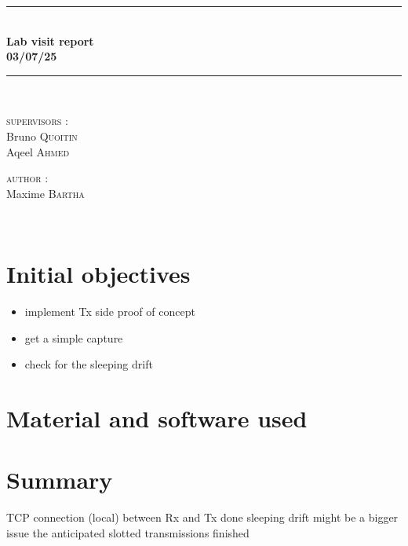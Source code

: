 \documentclass[a4paper, 12pt]{article}
\newcommand{\HRule}{\rule{\linewidth}{0.3mm}}
\begin{document}
\begin{center}
\HRule \\[0.3cm]
{ \LARGE \bfseries Lab visit report \\[0.3cm]}
{ \LARGE \bfseries 03/07/25 \\[0.1cm]} %
\HRule \\[1.5cm]

\begin{minipage}[t]{0.45\textwidth}
\begin{flushleft} \large
\textsc{supervisors :}\\
Bruno \textsc{Quoitin}\\
Aqeel \textsc{Ahmed}\\
\end{flushleft}

\end{minipage}
\begin{minipage}[t]{0.45\textwidth}
\begin{flushright} \large
\textsc{author :}\\
Maxime \textsc{Bartha}\\
\end{flushright}
\end{minipage}\\[2ex]
\end{center}


\section{Initial objectives}
\begin{itemize}
  \item implement Tx side proof of concept 
  \item get a simple capture
  \item check for the sleeping drift 
\end{itemize}

\section{Material and software used}

\section{Summary}
TCP connection (local)  between Rx and Tx done
sleeping drift might be a bigger issue the anticipated
slotted transmissions finished 
\end{document}
